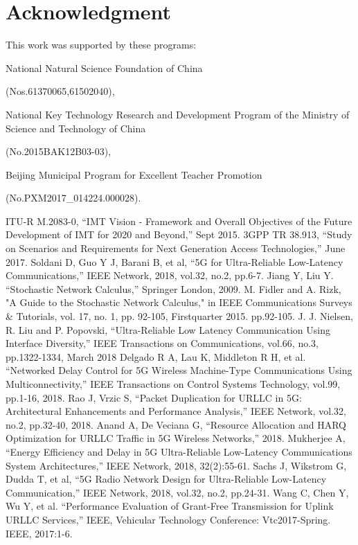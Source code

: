 \documentclass[conference]{IEEEtran}
\begin{document}
\section*{Acknowledgment}

This work was supported by these programs:

National Natural Science Foundation of China

(Nos.61370065,61502040),

National Key Technology Research and Development Program of the Ministry of Science and Technology of China

(No.2015BAK12B03-03),

Beijing Municipal Program for Excellent Teacher Promotion

(No.PXM2017\_014224.000028).

\begin{thebibliography}{00}
 ITU-R M.2083-0, “IMT Vision - Framework and Overall Objectives of the Future Development of IMT for 2020 and Beyond,” Sept 2015.
 3GPP TR 38.913, “Study on Scenarios and Requirements for Next Generation Access Technologies,” June 2017.
 Soldani D, Guo Y J, Barani B, et al, “5G for Ultra-Reliable Low-Latency Communications,” IEEE Network, 2018, vol.32, no.2, pp.6-7.
 Jiang Y, Liu Y. “Stochastic Network Calculus,” Springer London, 2009.
 M. Fidler and A. Rizk, "A Guide to the Stochastic Network Calculus," in IEEE Communications Surveys \& Tutorials, vol. 17, no. 1, pp. 92-105, Firstquarter 2015. pp.92-105.
 J. J. Nielsen, R. Liu and P. Popovski, “Ultra-Reliable Low Latency Communication Using Interface Diversity,” IEEE Transactions on Communications, vol.66, no.3, pp.1322-1334, March 2018
 Delgado R A, Lau K, Middleton R H, et al. “Networked Delay Control for 5G Wireless Machine-Type Communications Using Multiconnectivity,” IEEE Transactions on Control Systems Technology, vol.99, pp.1-16, 2018.
 Rao J, Vrzic S, “Packet Duplication for URLLC in 5G: Architectural Enhancements and Performance Analysis,” IEEE Network, vol.32, no.2, pp.32-40, 2018.
 Anand A, De Veciana G, “Resource Allocation and HARQ Optimization for URLLC Traffic in 5G Wireless Networks,” 2018.
 Mukherjee A, “Energy Efficiency and Delay in 5G Ultra-Reliable Low-Latency Communications System Architectures,” IEEE Network, 2018, 32(2):55-61.
 Sachs J, Wikstrom G, Dudda T, et al, “5G Radio Network Design for Ultra-Reliable Low-Latency Communication,” IEEE Network, 2018, vol.32, no.2, pp.24-31.
 Wang C, Chen Y, Wu Y, et al. “Performance Evaluation of Grant-Free Transmission for Uplink URLLC Services,” IEEE, Vehicular Technology Conference: Vtc2017-Spring. IEEE, 2017:1-6.


\end{thebibliography}
\end{document}
